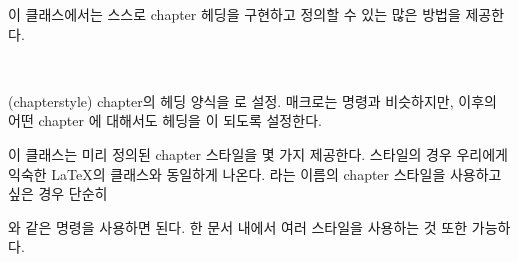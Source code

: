 
이 클래스에서는 스스로 chapter 헤딩을 구현하고 정의할 수 있는 많은 방법을 제공한다.

\begin{syntax}
\cmd{\chapterstyle} \\
\end{syntax}
\glossary(chapterstyle)%
  {}%
  {chapter의 헤딩 양식을 로 설정.}
\cmd{\chapterstyle} 매크로는 \cmd{\pagestyle} 명령과 비슷하지만,
이후의 어떤 chapter 에 대해서도 헤딩을 이 되도록 설정한다.

이 클래스는 미리 정의된 chapter 스타일을 몇 가지 제공한다.
 스타일의 경우 우리에게 익숙한 \LaTeX{}의  클래스와
동일하게 나온다.
 라는 이름의 chapter 스타일을 사용하고 싶은 경우 단순히
\begin{lcode}
\end{lcode}
와 같은 명령을 사용하면 된다. 한 문서 내에서 여러 스타일을 사용하는 것 또한 가능하다.

